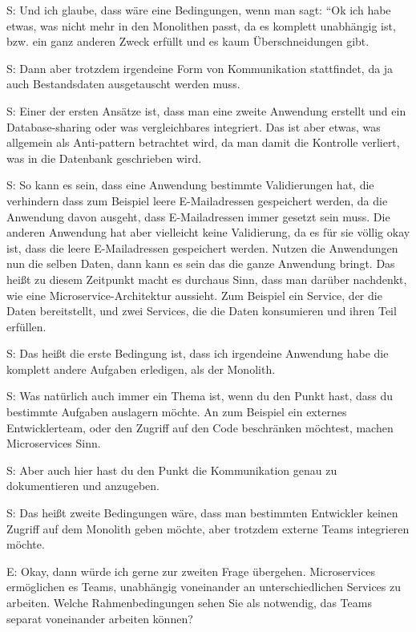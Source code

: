  \label{appendix:s-5}
S: Und ich glaube, dass wäre eine Bedingungen, wenn man sagt: “Ok ich habe etwas, was nicht mehr in den Monolithen passt, da es komplett unabhängig ist, bzw. ein ganz anderen Zweck erfüllt und es kaum Überschneidungen gibt.

 \label{appendix:s-6}  \label{appendix:s-7}
S: Dann aber trotzdem irgendeine Form von Kommunikation stattfindet, da ja auch Bestandsdaten ausgetauscht werden muss.

S: Einer der ersten Ansätze ist, dass man eine zweite Anwendung erstellt und ein Database-sharing oder was vergleichbares integriert. Das ist aber etwas, was allgemein als Anti-pattern betrachtet wird, da man damit die Kontrolle verliert, was in die Datenbank geschrieben wird.

 \label{appendix:s-8}
S: So kann es sein, dass eine Anwendung bestimmte Validierungen hat, die verhindern dass zum Beispiel leere E-Mailadressen gespeichert werden, da die Anwendung davon ausgeht, dass E-Mailadressen immer gesetzt sein muss. Die anderen Anwendung hat aber vielleicht keine Validierung, da es für sie völlig okay ist, dass die leere E-Mailadressen gespeichert werden. Nutzen die Anwendungen nun die selben Daten, dann kann es sein das die ganze Anwendung bringt. Das heißt zu diesem Zeitpunkt macht es durchaus Sinn, dass man darüber nachdenkt, wie eine Microservice-Architektur aussieht. Zum Beispiel ein Service, der die Daten bereitstellt, und zwei Services, die die Daten konsumieren und ihren Teil erfüllen.

 \label{appendix:s-9}
S: Das heißt die erste Bedingung ist, dass ich irgendeine Anwendung habe die komplett andere Aufgaben erledigen, als der Monolith.

 \label{appendix:s-10}  \label{appendix:s-11}
S: Was natürlich auch immer ein Thema ist, wenn du den Punkt hast, dass du bestimmte Aufgaben auslagern möchte. An zum Beispiel ein externes Entwicklerteam, oder den Zugriff auf den Code beschränken möchtest, machen Microservices Sinn.

 \label{appendix:s-12}
S: Aber auch hier hast du den Punkt die Kommunikation genau zu dokumentieren und anzugeben.

S: Das heißt zweite Bedingungen wäre, dass man bestimmten Entwickler keinen Zugriff auf dem Monolith geben möchte, aber trotzdem externe Teams integrieren möchte.

E: Okay, dann würde ich gerne zur zweiten Frage übergehen.
Microservices ermöglichen es Teams, unabhängig voneinander an unterschiedlichen Services zu arbeiten. Welche Rahmenbedingungen sehen Sie als notwendig, das Teams separat voneinander arbeiten können? 

